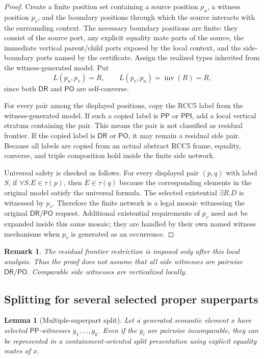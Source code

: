 \documentclass[11pt]{article}
\newtheorem{lemma}[theorem]{Lemma}
\newtheorem{remark}[theorem]{Remark}
\newcommand{\DR}{\mathsf{DR}}
\newcommand{\PO}{\mathsf{PO}}
\newcommand{\PP}{\mathsf{PP}}
\newcommand{\PPI}{\mathsf{PPI}}
\newcommand{\Inv}{\operatorname{inv}}
\begin{document}
\begin{proof}
Create a finite position set containing a source position $p_u$, a witness position $p_v$, and the boundary positions through which the source interacts with the surrounding context.  The necessary boundary positions are finite: they consist of the source port, any explicit equality mate ports of the source, the immediate vertical parent/child ports exposed by the local context, and the side-boundary ports named by the certificate.  Assign the realized types inherited from the witness-generated model.  Put
\[
   L(p_u,p_v)=R,
   \qquad
   L(p_v,p_u)=\Inv(R)=R,
\]
since both $\DR$ and $\PO$ are self-converse.

For every pair among the displayed positions, copy the RCC5 label from the witness-generated model.  If such a copied label is $\PP$ or $\PPI$, add a local vertical stratum containing the pair.  This means the pair is not classified as residual frontier.  If the copied label is $\DR$ or $\PO$, it may remain a residual side pair.  Because all labels are copied from an actual abstract RCC5 frame, equality, converse, and triple composition hold inside the finite side network.

Universal safety is checked as follows.  For every displayed pair $(p,q)$ with label $S$, if $\forall S.E\in\tau(p)$, then $E\in\tau(q)$ because the corresponding elements in the original model satisfy the universal formula.  The selected existential $\exists R.D$ is witnessed by $p_v$.  Therefore the finite network is a legal mosaic witnessing the original $\DR/\PO$ request.  Additional existential requirements of $p_v$ need not be expanded inside this same mosaic; they are handled by their own named witness mechanisms when $p_v$ is generated as an occurrence.
\end{proof}

\begin{remark}
The residual frontier restriction is imposed only after this local analysis.  Thus the proof does not assume that all side witnesses are pairwise $\DR/\PO$.  Comparable side witnesses are verticalized locally.
\end{remark}

\subsection{Splitting for several selected proper superparts}

\begin{lemma}[Multiple-superpart split]\label{lem:multiple-superpart-split}
Let a generated semantic element $x$ have selected $\PP$-witnesses $y_1,\ldots,y_k$.  Even if the $y_i$ are pairwise incomparable, they can be represented in a containment-oriented split presentation using explicit equality mates of $x$.
\end{lemma}
\end{document}
